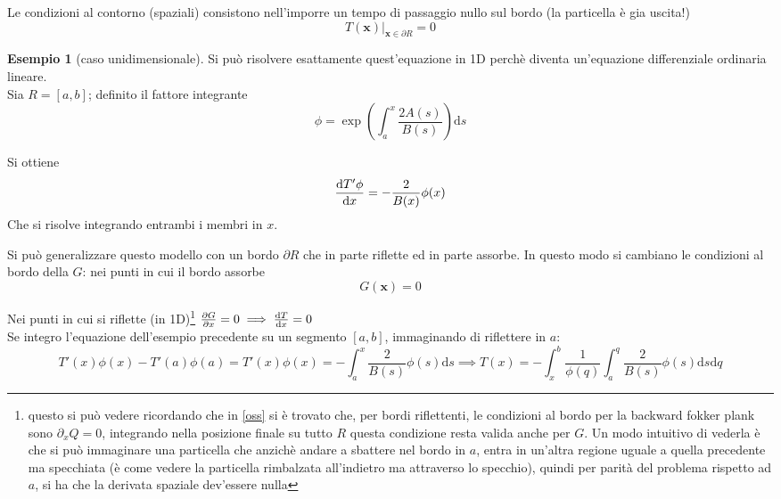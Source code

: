 \documentclass[a4paper,12pt]{article}
\newcommand{\eva}[2]{\left.#1\right|_{#2}}
\theoremstyle{plain}
\renewcommand{\vec}[1]{{\boldsymbol{#1}}}
\theoremstyle{definition}
\newtheorem{exmp}{Esempio}[section]
\newcommand{\f}[2]{\frac{#1}{#2}}
\renewcommand{\d}{\text{d}}
\newcommand{\pos}{\vec{x}}
\theoremstyle{remark}
\begin{document}
Le condizioni al contorno (spaziali) consistono nell'imporre un tempo di passaggio nullo sul bordo (la particella è gia uscita!)
\[\eva{T(\pos)}{\pos\in \partial R}=0\]
 \begin{exmp}[caso unidimensionale]
Si può risolvere esattamente quest'equazione in 1D perchè diventa un'equazione differenziale ordinaria lineare.\\Sia $R=[a,b]$; definito il fattore integrante 
\[\phi=	\exp(\int_a^x\f{2 A(s)}{B(s)})\d s			\]

Si ottiene
\[\dv{ T'\phi}{x}=-\f{2}{B(x)}\phi(x)	\]
Che si risolve integrando entrambi i membri in $x$.
\end{exmp}
Si può generalizzare questo modello con un bordo $\partial R$ che in parte riflette ed in parte assorbe. In questo modo si cambiano le condizioni al bordo della $G$: nei punti in cui il bordo assorbe
\[G(\pos)=0\]

Nei punti in cui si riflette (in 1D)\footnote{questo si può vedere ricordando  che in \ref{oss} si è trovato che, per bordi riflettenti, le condizioni al bordo per la backward fokker plank sono $\partial_x Q=0$, integrando nella posizione finale su tutto $R$ questa condizione resta valida anche per $G$. Un modo intuitivo di vederla è che si può immaginare una particella che anzichè andare a sbattere nel bordo in $a$, entra in un'altra regione uguale a quella precedente ma specchiata (è come vedere la particella rimbalzata all'indietro ma attraverso lo specchio), quindi per parità del problema rispetto ad $a$, si ha che la derivata spaziale dev'essere nulla} $\pdv{G}{x}=0\implies\dv{T}{x}=0$
\\Se integro l'equazione dell'esempio precedente su un segmento $[a,b]$, immaginando di riflettere in $a$:
\[T'(x)\phi(x)-T'(a)\phi(a)=T'(x)\phi(x)=-\int_a^x 	\f{2}{B(s)}\phi(s)	\d s\implies  T(x)	=-\int_x^b	\f{1}{\phi(q)}\int_a^q 	\f{2}{B(s)}\phi(s)	\d s	\d q		\]
\end{document}
